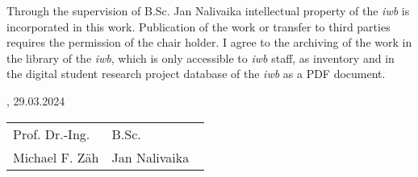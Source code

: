 Through the supervision of B.Sc. Jan Nalivaika intellectual property of the \textit{iwb} is incorporated in this work. Publication of the work or transfer to third parties requires the permission of the chair holder. I agree to the archiving of the work in the library of the \textit{iwb}, which is only accessible to \textit{iwb} staff, as inventory and in the digital student research project database of the \textit{iwb} as a PDF document.
\vfill

\IWBaddressCityChair, 29.03.2024
\vspace{2.5cm}\\
\begin{tabular}{p{0.5\linewidth}p{0.5\linewidth} }
	Prof. Dr.-Ing.		& B.Sc.\\
Michael F. Zäh  	& Jan Nalivaika
\end{tabular}
